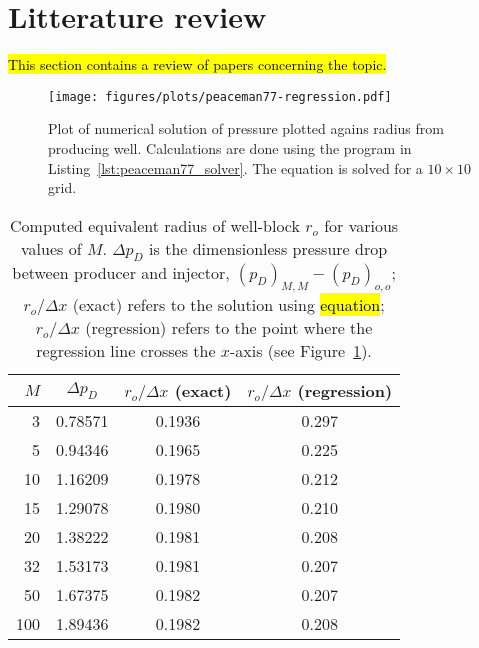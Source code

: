 
\section{Litterature review} %
\label{sec:litterature_review}
\hl{This section contains a review of papers concerning the topic.}

\begin{figure}[htbp]
    \centering
    \texttt{[image: figures/plots/peaceman77-regression.pdf]}
    \caption{Plot of numerical solution of pressure plotted agains radius from producing well. Calculations are done using the program in Listing~\ref{lst:peaceman77_solver}. The equation is solved for a $10\times 10$ grid.}
    \label{fig:peaceman77_pressure_vs_radius}
\end{figure}

\begin{table}
    \centering
    \caption{Computed equivalent radius of well-block $r_o$ for various values of $M$. $\Delta p_D$ is the dimensionless pressure drop between producer and injector, $(p_D)_{M,M} - (p_D)_{o,o}$; $r_o/\Delta x$ (exact) refers to the solution using \hl{equation}; $r_o / \Delta x$ (regression) refers to the point where the regression line crosses the $x$-axis (see Figure~\ref{fig:peaceman77_pressure_vs_radius}).}
    \begin{tabular}{rccc}
        \toprule
        $M$ & $\Delta p_D$ & $r_o/\Delta x$ (exact) & $r_o / \Delta x$ (regression)\\
        \midrule
        3   & 0.78571 & 0.1936 & 0.297 \\
        5   & 0.94346 & 0.1965 & 0.225 \\
        10  & 1.16209 & 0.1978 & 0.212 \\
        15  & 1.29078 & 0.1980 & 0.210 \\
        20  & 1.38222 & 0.1981 & 0.208 \\
        32  & 1.53173 & 0.1981 & 0.207 \\
        50  & 1.67375 & 0.1982 & 0.207 \\
        100 & 1.89436 & 0.1982 & 0.208 \\
        \bottomrule
    \end{tabular}
    \label{tbl:label}
\end{table}

